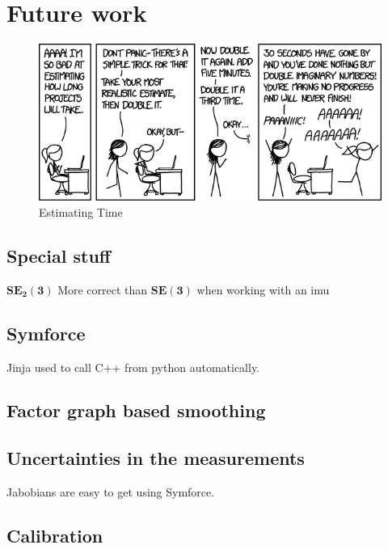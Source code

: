 \chapter{Future work}
\begin{figure}
    \centering
    \includegraphics[width=\textwidth]{figures/estimating_time.png}
    \caption{Estimating Time \cite{xkcdEstimatingTime2016}}
    \label{fig:xkcd_time}
\end{figure}


\section{Special stuff}
$\mathbf{SE_2(3)}$
More correct than $\mathbf{SE(3)}$ when working with an \gls{imu}

\section{Symforce}
Jinja used to call C++ from python automatically.

\section{Factor graph based smoothing}

\section{Uncertainties in the measurements}
Jabobians are easy to get using Symforce.

\section{Calibration}
